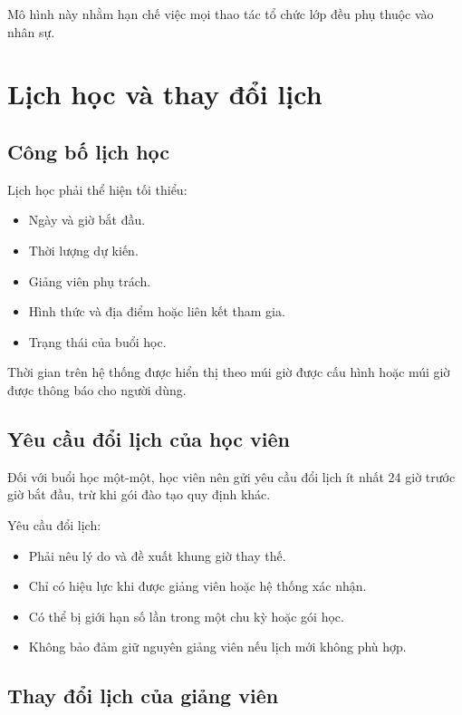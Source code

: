 \documentclass[12pt,a4paper]{article}
\begin{document}
Mô hình này nhằm hạn chế việc mọi thao tác tổ chức lớp đều phụ thuộc vào nhân sự.

\section{Lịch học và thay đổi lịch}

\subsection{Công bố lịch học}

Lịch học phải thể hiện tối thiểu:

\begin{itemize}
    \item Ngày và giờ bắt đầu.
    \item Thời lượng dự kiến.
    \item Giảng viên phụ trách.
    \item Hình thức và địa điểm hoặc liên kết tham gia.
    \item Trạng thái của buổi học.
\end{itemize}

Thời gian trên hệ thống được hiển thị theo múi giờ được cấu hình
hoặc múi giờ được thông báo cho người dùng.

\subsection{Yêu cầu đổi lịch của học viên}

Đối với buổi học một-một, học viên nên gửi yêu cầu đổi lịch
ít nhất 24 giờ trước giờ bắt đầu, trừ khi gói đào tạo quy định khác.

Yêu cầu đổi lịch:

\begin{itemize}
    \item Phải nêu lý do và đề xuất khung giờ thay thế.
    \item Chỉ có hiệu lực khi được giảng viên hoặc hệ thống xác nhận.
    \item Có thể bị giới hạn số lần trong một chu kỳ hoặc gói học.
    \item Không bảo đảm giữ nguyên giảng viên nếu lịch mới không phù hợp.
\end{itemize}

\subsection{Thay đổi lịch của giảng viên}
\end{document}
